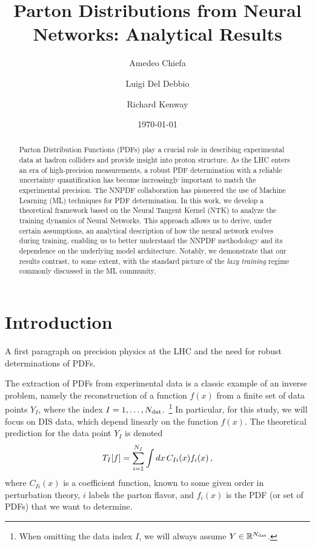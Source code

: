 \documentclass[11pt]{article}
\title{Parton Distributions from Neural Networks: Analytical Results}
\author{Amedeo Chiefa}
\author{Luigi Del Debbio}
\author{Richard Kenway}
\affil{Higgs Centre for Theoretical Physics, School of Physics and Astronomy,
Peter~Guthrie~Tait~Road, Edinburgh EH9 3FD, United Kingdom.}
\date{\today}
\begin{document}
\maketitle

\begin{abstract}
  Parton Distribution Functions (PDFs) play a crucial role in describing
  experimental data at hadron colliders and provide insight into proton
  structure. As the LHC enters an era of high-precision measurements, a robust
  PDF determination with a reliable uncertainty quantification has become
  increasingly important to match the experimental precision. The NNPDF
  collaboration has pioneered the use of Machine Learning (ML) techniques for PDF
  determination. In this work, we develop a theoretical framework based on the
  Neural Tangent Kernel (NTK) to analyze the training dynamics of Neural
  Networks. This approach allows us to derive, under certain assumptions, an
  analytical description of how the neural network evolves during training,
  enabling us to better understand the NNPDF methodology and its dependence on
  the underlying model architecture. Notably, we demonstrate that our results
  contrast, to some extent, with the standard picture of the \textit{lazy training}
  regime commonly discussed in the ML community.
\end{abstract}

\section{Introduction}
\label{sec:intro}

A first paragraph on precision physics at the LHC and the need for robust determinations of PDFs.

The extraction of PDFs from experimental data is a classic example of an inverse problem,
namely the reconstruction of a function $f(x)$ from a finite set of data points
$Y_I$, where the index $I=1, \ldots, N_{\mathrm{dat}}$.~\footnote{When omitting the data index $I$, we will always
assume $Y \in \mathbb{R}^{N_{\mathrm{dat}}}$.} In particular, for this study, we will focus
on DIS data, which depend
linearly on the function $f(x)$. The theoretical prediction for the data point $Y_I$ is denoted
\begin{equation}
    \label{eq:TheoryPred}
    T_I[f] = \sum_{i=1}^{N_{f}} \int dx\, C_{Ii}(x) f_{i}(x)\, ,
\end{equation}
where $C_{Ii}(x)$ is a coefficient function, known to some given order in perturbation theory,
$i$ labels the parton flavor, and $f_i(x)$
is the PDF (or set of PDFs) that we want to determine.
\end{document}
